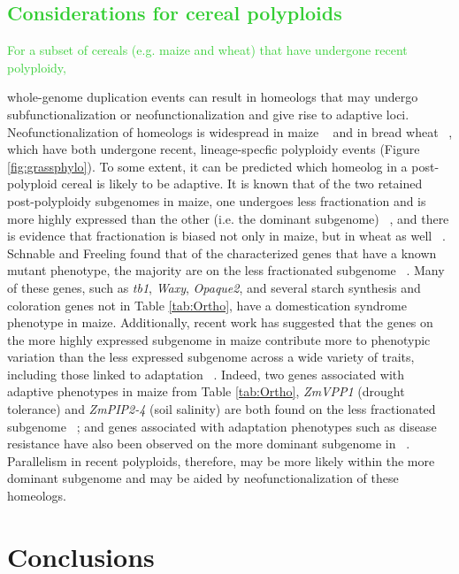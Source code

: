 \documentclass[12pt]{article}
\newcommand{\mw}[1]{\textcolor{LimeGreen}{\normalsize #1}}
\begin{document}
 \mw{
 \subsection*{Considerations for cereal polyploids}
 For a subset of cereals (e.g. maize and wheat) that have undergone recent polyploidy,} whole-genome duplication events can result in homeologs that may undergo subfunctionalization or neofunctionalization and give rise to adaptive loci.
Neofunctionalization of homeologs is widespread in maize ~\citep{Hughes2014} and in bread wheat ~\citep{Pfeifer2014}, which have both undergone recent, lineage-specfic polyploidy events (Figure \ref{fig:grassphylo}).
To some extent, it can be predicted which homeolog in a post-polyploid cereal is likely to be adaptive.
It is known that of the two retained post-polyploidy subgenomes in maize, one undergoes less fractionation and is more highly expressed than the other (i.e. the dominant subgenome) ~\citep{Woodhouse2010, Schnable2011}, and there is evidence that fractionation is biased not only in maize, but in wheat as well ~\citep{Eckardt2014}.
Schnable and Freeling found that of the characterized genes that have a known mutant phenotype, the majority are on the less fractionated subgenome ~\citep{Schnable20112}.
Many of these genes, such as \textit{tb1}, \textit{Waxy}, \textit{Opaque2}, and several starch synthesis and coloration genes not in Table \ref{tab:Ortho}, have a domestication syndrome phenotype in maize.
Additionally, recent work has suggested that the genes on the more highly expressed subgenome in maize contribute more to phenotypic variation than the less expressed subgenome across a wide variety of traits, including those linked to adaptation ~\citep{RennyByfield2017}.
Indeed, two genes associated with adaptive phenotypes in maize from Table \ref{tab:Ortho}, \textit{ZmVPP1} (drought tolerance) and \textit{ZmPIP2-4} (soil salinity) are both found on the less fractionated subgenome ~\citep{Schnable20112}; and genes associated with adaptation phenotypes such as disease resistance have also been observed on the more dominant subgenome in ~\citep{RennyByfield2017}. 
Parallelism in recent polyploids, therefore, may be more likely within the more dominant subgenome and may be aided by neofunctionalization of these homeologs.

\section*{Conclusions}
\end{document}
